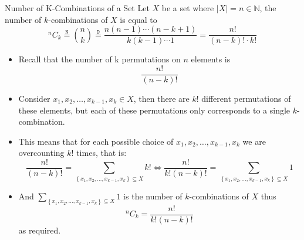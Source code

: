 \documentclass{standalone}
\begin{document}
\begin{theo*}{Number of K-Combinations of a Set}
Let $X$ be a set where $\left| X \right|=n \in \mathbb{N}$, the number of $k$-combinations of $X$  is equal to 
\[
	{{}^{n}\!C_{k}} \stackrel{\mathtt{N}}{=} \binom{n}{k} \stackrel{\mathtt{D}}{=}\frac{n \left( n-1 \right) \dotsb \left( n -k  + 1 \right)}{k \left( k-1 \right)\dotsb 1} = \frac{n!}{(n-k)!\cdot k!} 
\]
\begin{pf}
  \begin{itemize}
   \item Recall that the number of k permutations on $n$ elements is 
     \[
     \frac{n!}{ \left( n-k \right)!}
     \]
    \item Consider $ x_{1} , x_{2} , \dotsc  , x_{k - 1} , x_{k} \in X$, then there are $k!$ different permutations of these elements, but each of these permutations only corresponds to a single $k$-combination.
    \item This means that for each possible choice of $ x_{1} , x_{2} , \dotsc  , x_{k - 1} , x_{k}$ we are overcounting $k!$ times, that is:
      \[
      \frac{n!}{ \left(  n  - k \right)!} = \sum_{ \left\{ x_{1} , x_{2} , \dotsc  , x_{k - 1} , x_{k} \right\} \subseteq X} k! \Leftrightarrow \frac{n!}{ k! \left(  n  - k \right)!} = \sum_{ \left\{ x_{1} , x_{2} , \dotsc  , x_{k - 1} , x_{k} \right\} \subseteq X} 1
      \]
    \item And $\sum_{ \left\{ x_{1} , x_{2} , \dotsc  , x_{k - 1} , x_{k} \right\} \subseteq X} 1$ is the number of $k$-combinations of $X$ thus
      \[
      {{}^{n}\!C_{k}} = \frac{n!}{ k! \left(  n  - k \right)!} 
      \]
      as required.
  \end{itemize}

\end{pf}
\end{theo*}
\end{document}
